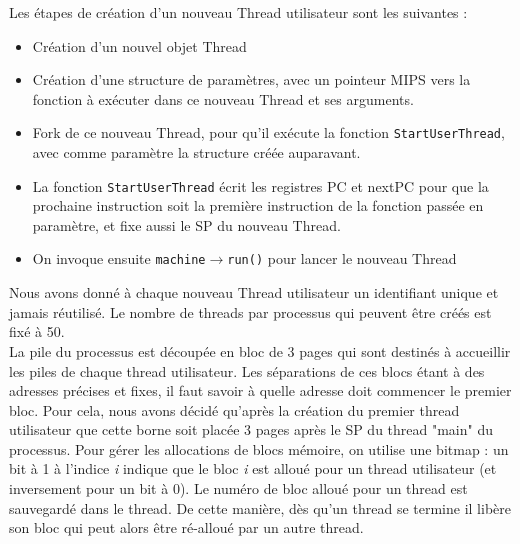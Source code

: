 \documentclass{report}
\begin{document}
\noindent
Les étapes de création d'un nouveau Thread utilisateur sont les suivantes : 
\begin{itemize}
	\item Création d'un nouvel objet Thread
	\item Création d'une structure de paramètres, avec un pointeur MIPS vers la fonction à exécuter dans ce nouveau Thread et ses arguments.
	\item Fork de ce nouveau Thread, pour qu'il exécute la fonction \texttt{StartUserThread}, avec comme paramètre la structure créée auparavant.
	\item La fonction \texttt{StartUserThread} écrit les registres PC et nextPC pour que la prochaine instruction soit la première instruction de la fonction passée en paramètre, et fixe aussi le SP du nouveau Thread.
	\item On invoque ensuite \texttt{machine$\rightarrow$run()} pour lancer le nouveau Thread
\end{itemize}

Nous avons donné à chaque nouveau Thread utilisateur un identifiant unique et jamais réutilisé. Le nombre de threads par processus qui peuvent être créés est fixé à 50.\\

La pile du processus est découpée en bloc de 3 pages qui sont destinés à accueillir les piles de chaque thread utilisateur. Les séparations de ces blocs étant à des adresses précises et fixes, il faut savoir à quelle adresse doit commencer le premier bloc. Pour cela, nous avons décidé qu'après la création du premier thread utilisateur que cette borne soit placée 3 pages après le SP du thread "main" du processus. Pour gérer les allocations de blocs mémoire, on utilise une bitmap : un bit à 1 à l'indice \textit{i} indique que le bloc \textit{i} est alloué pour un thread utilisateur (et inversement pour un bit à 0). Le numéro de bloc alloué pour un thread est sauvegardé dans le thread. De cette manière, dès qu'un thread se termine il libère son bloc qui peut alors être ré-alloué par un autre thread. \\ 
   
\end{document}
